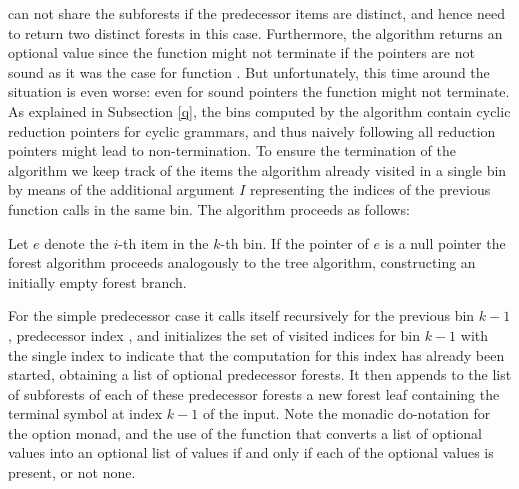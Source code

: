 \begin{isabellebody}
\begin{isamarkuptext}
can not share the subforests if the predecessor items are distinct, and hence need to return two distinct forests in this case. Furthermore, the algorithm returns an
optional value since the function might not terminate if the pointers are not sound as it was the case
for function . But unfortunately, this time around the situation is even worse:
even for sound pointers the function  might not terminate.
As explained in Subsection \ref{q}, the bins computed by the algorithm  contain
cyclic reduction pointers for cyclic grammars, and thus naively following all reduction pointers might lead
to non-termination. To ensure the termination of the algorithm we keep track of the items the algorithm
already visited in a single bin by means of the additional argument $I$ representing the indices
of the previous function calls in the same bin. The algorithm proceeds as follows:

Let $e$ denote the $i$-th item in the $k$-th bin. If the pointer of $e$ is
a null pointer the forest algorithm proceeds analogously to the tree algorithm, constructing an initially
empty forest branch.

For the simple predecessor case it calls itself recursively for the previous bin
$k-1$, predecessor index , and initializes the set of visited indices for bin $k-1$ with
the single index  to indicate that the computation for this index has already been started, obtaining a list of optional predecessor forests. It then appends
to the list of subforests of each of these predecessor forests a new forest leaf containing the terminal symbol at
index $k-1$ of the input. Note the monadic do-notation for the option monad, and the use
of the function  that converts a list of optional values into an optional list of values
if and only if each of the optional values is present, or not none.


\end{isamarkuptext}
\end{isabellebody}
